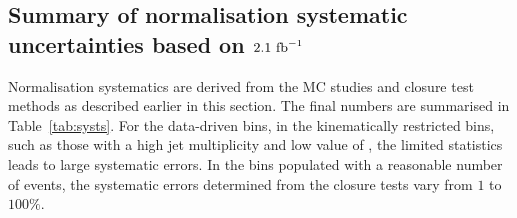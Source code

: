 %
%
%

\subsection{Summary of normalisation systematic uncertainties based on $2.1~\ifb$}
\label{sec:closure-test-syst}

Normalisation systematics are derived from the MC studies and closure
test methods as described earlier in this section. The final numbers are summarised
in Table~\ref{tab:systs}. For the data-driven bins, in the kinematically restricted bins, such
as those with a high jet multiplicity and low value of \scalht, the
limited statistics leads to large systematic errors. In the bins populated 
with a reasonable number of events, the
systematic errors determined from the closure tests vary from $1$ to
$100\%$.

